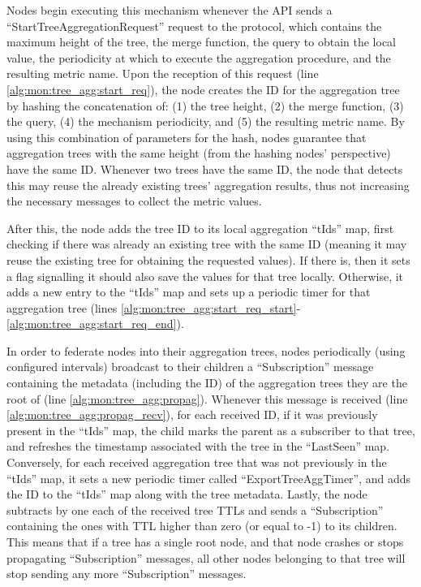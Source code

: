

Nodes begin executing this mechanism whenever the API sends a ``StartTreeAggregationRequest'' request to the protocol, which contains the maximum height of the tree, the merge function, the query to obtain the local value, the periodicity at which to execute the aggregation procedure, and the resulting metric name. Upon the reception of this request (line \ref{alg:mon:tree_agg:start_req}), the node creates the ID for the aggregation tree by hashing the concatenation of: (1) the tree height, (2) the merge function, (3) the query, (4) the mechanism periodicity, and (5) the resulting metric name. By using this combination of parameters for the hash, nodes guarantee that aggregation trees with the same height (from the hashing nodes' perspective) have the same ID. Whenever two trees have the same ID, the node that detects this may reuse the already existing trees' aggregation results, thus not increasing the necessary messages to collect the metric values.
 
 After this, the node adds the tree ID to its local aggregation ``tIds'' map, first checking if there was already an existing tree with the same ID (meaning it may reuse the existing tree for obtaining the requested values). If there is, then it sets a flag signalling it should also save the values for that tree locally. Otherwise, it adds a new entry to the ``tIds'' map and sets up a periodic timer for that aggregation tree (lines \ref{alg:mon:tree_agg:start_req_start}-\ref{alg:mon:tree_agg:start_req_end}).

In order to federate nodes into their aggregation trees, nodes periodically (using configured intervals) broadcast to their children a ``Subscription'' message containing the metadata (including the ID) of the aggregation trees they are the root of (line \ref{alg:mon:tree_agg:propag}). Whenever this message is received (line \ref{alg:mon:tree_agg:propag_recv}), for each received ID, if it was previously present in the ``tIds'' map, the child marks the parent as a subscriber to that tree, and refreshes the timestamp associated with the tree in the ``LastSeen'' map. Conversely, for each received aggregation tree that was not previously in the ``tIds'' map, it sets a new periodic timer called ``ExportTreeAggTimer'', and adds the ID to the ``tIds'' map along with the tree metadata. Lastly, the node subtracts by one each of the received tree TTLs and sends a ``Subscription'' containing the ones with TTL higher than zero (or equal to -1) to its children. This means that if a tree has a single root node, and that node crashes or stops propagating ``Subscription'' messages, all other nodes belonging to that tree will stop sending any more ``Subscription'' messages.

